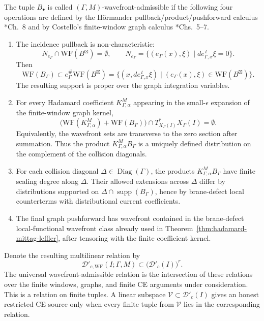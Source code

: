 \begin{defn}
  The tuple \(B_\bullet\) is called
  \((\Gamma,M)\)-wavefront-admissible if the following four operations are
  defined by the H\"ormander pullback/product/pushforward calculus
  \cite{hormander-vol1}*{Ch.~8} and by Costello's finite-window graph
  calculus \cite{costello-renormalization}*{Chs.~5--7}.
  \begin{enumerate}
    \item The incidence pullback is non-characteristic:
    \[
      N_{e_\Gamma}\cap\mathrm{WF}(B^\boxtimes)=\emptyset,\qquad
      N_{e_\Gamma}=
      \{(e_\Gamma(x),\xi)\mid de_{\Gamma,x}^{\,t}\xi=0\}.
    \]
    Then
    \[
      \mathrm{WF}(B_\Gamma)\subset
      e_\Gamma^\#\mathrm{WF}(B^\boxtimes)
      =
      \{(x,de_{\Gamma,x}^{\,t}\xi)\mid
      (e_\Gamma(x),\xi)\in\mathrm{WF}(B^\boxtimes)\}.
    \]
    The resulting support is proper over the graph integration variables.
    \item For every Hadamard coefficient
    \(K^M_{\Gamma,\alpha}\) appearing in the small-\(\epsilon\) expansion
    of the finite-window graph kernel,
    \[
      \bigl(
      \mathrm{WF}(K^M_{\Gamma,\alpha})
      +\mathrm{WF}(B_\Gamma)
      \bigr)
      \cap T^*_{X_\Gamma(I)}X_\Gamma(I)=\emptyset .
    \]
    Equivalently, the wavefront sets are transverse to the zero section
    after summation.  Thus the product
    \(K^M_{\Gamma,\alpha}B_\Gamma\) is a uniquely defined distribution on
    the complement of the collision diagonals.
    \item For each collision diagonal
    \(\Delta\in\operatorname{Diag}(\Gamma)\), the products
    \(K^M_{\Gamma,\alpha}B_\Gamma\) have finite scaling degree along
    \(\Delta\).  Their allowed extensions across \(\Delta\) differ by
    distributions supported on
    \(\Delta\cap\operatorname{supp}(B_\Gamma)\), hence by brane-defect
    local counterterms with distributional current coefficients.
    \item The final graph pushforward has wavefront contained in the
    brane-defect local-functional wavefront class already used in
    Theorem~\ref{thm:hadamard-mittag-leffler}, after tensoring with the
    finite coefficient kernel.
  \end{enumerate}
  Denote the resulting multilinear relation by
  \[
    \mathcal D'_{c,\mathrm{WF}}(I;\Gamma,M)
      \subset \bigl(\mathcal D'_c(I)\bigr)^r .
  \]
  The universal wavefront-admissible relation is the intersection of
  these relations over the finite windows, graphs, and finite CE arguments
  under consideration.  This is a relation on finite tuples.  A linear
  subspace \(\mathcal V\subset\mathcal D'_c(I)\) gives an honest
  restricted CE source only when every finite tuple from \(\mathcal V\)
  lies in the corresponding relation.


\end{defn}

